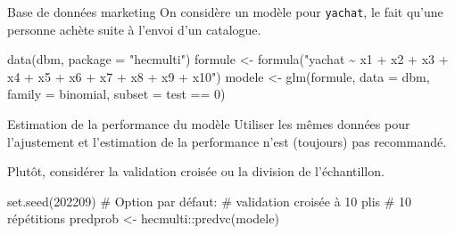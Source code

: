 \documentclass[
  ignorenonframetext,
]{beamer}
\newenvironment{Shaded}{\begin{snugshade}}{\end{snugshade}}
\newcommand{\AttributeTok}[1]{\textcolor[rgb]{0.40,0.45,0.13}{#1}}
\newcommand{\CommentTok}[1]{\textcolor[rgb]{0.37,0.37,0.37}{#1}}
\newcommand{\DecValTok}[1]{\textcolor[rgb]{0.68,0.00,0.00}{#1}}
\newcommand{\FunctionTok}[1]{\textcolor[rgb]{0.28,0.35,0.67}{#1}}
\newcommand{\NormalTok}[1]{\textcolor[rgb]{0.00,0.23,0.31}{#1}}
\newcommand{\OtherTok}[1]{\textcolor[rgb]{0.00,0.23,0.31}{#1}}
\newcommand{\SpecialCharTok}[1]{\textcolor[rgb]{0.37,0.37,0.37}{#1}}
\newcommand{\StringTok}[1]{\textcolor[rgb]{0.13,0.47,0.30}{#1}}
\begin{document}
\begin{frame}[fragile]{Base de données marketing}
\protect\hypertarget{base-de-donnuxe9es-marketing}{}
On considère un modèle pour \texttt{yachat}, le fait qu'une personne
achète suite à l'envoi d'un catalogue.

\begin{Shaded}
\begin{Highlighting}[numbers=left,,]
\FunctionTok{data}\NormalTok{(dbm, }\AttributeTok{package =} \StringTok{"hecmulti"}\NormalTok{)}
\NormalTok{formule }\OtherTok{\textless{}{-}} \FunctionTok{formula}\NormalTok{(}\StringTok{"yachat \textasciitilde{} x1 + x2 + x3 +}
\StringTok{                x4 + x5 + x6 + x7 + x8 + x9 + x10"}\NormalTok{)}
\NormalTok{modele }\OtherTok{\textless{}{-}} \FunctionTok{glm}\NormalTok{(formule,}
              \AttributeTok{data =}\NormalTok{ dbm, }
              \AttributeTok{family =}\NormalTok{ binomial,}
              \AttributeTok{subset =}\NormalTok{ test }\SpecialCharTok{==} \DecValTok{0}\NormalTok{)}
\end{Highlighting}
\end{Shaded}
\end{frame}

\begin{frame}[fragile]{Estimation de la performance du modèle}
\protect\hypertarget{estimation-de-la-performance-du-moduxe8le}{}
Utiliser les mêmes données pour l'ajustement et l'estimation de la
performance n'est (toujours) pas recommandé.

Plutôt, considérer la validation croisée ou la division de
l'échantillon.

\begin{Shaded}
\begin{Highlighting}[numbers=left,,]
\FunctionTok{set.seed}\NormalTok{(}\DecValTok{202209}\NormalTok{)}
\CommentTok{\# Option par défaut: }
\CommentTok{\# validation croisée à 10 plis}
\CommentTok{\# 10 répétitions}
\NormalTok{predprob }\OtherTok{\textless{}{-}}\NormalTok{ hecmulti}\SpecialCharTok{::}\FunctionTok{predvc}\NormalTok{(modele)}
\end{Highlighting}
\end{Shaded}
\end{frame}
\end{document}
